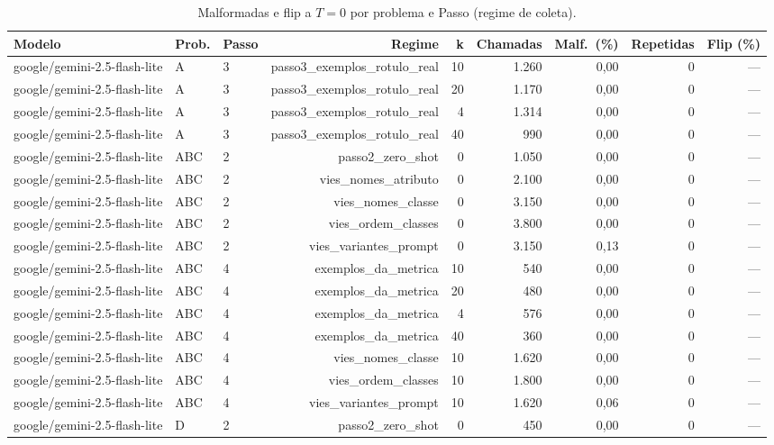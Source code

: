 \begin{table}[htbp]
\centering
\small
\caption{Malformadas e flip a $T=0$ por problema e Passo (regime de coleta).}
\label{tab:final_auditoria_flip_por_passo}
\begin{tabular}{lllrrrrrr}
\toprule
Modelo & Prob. & Passo & Regime & k & Chamadas & Malf.\ (\%) & Repetidas & Flip (\%) \\
\midrule
google/gemini-2.5-flash-lite & A & 3 & passo3\_exemplos\_rotulo\_real & 10 & 1.260 & 0,00 & 0 & — \\
google/gemini-2.5-flash-lite & A & 3 & passo3\_exemplos\_rotulo\_real & 20 & 1.170 & 0,00 & 0 & — \\
google/gemini-2.5-flash-lite & A & 3 & passo3\_exemplos\_rotulo\_real & 4 & 1.314 & 0,00 & 0 & — \\
google/gemini-2.5-flash-lite & A & 3 & passo3\_exemplos\_rotulo\_real & 40 & 990 & 0,00 & 0 & — \\
google/gemini-2.5-flash-lite & ABC & 2 & passo2\_zero\_shot & 0 & 1.050 & 0,00 & 0 & — \\
google/gemini-2.5-flash-lite & ABC & 2 & vies\_nomes\_atributo & 0 & 2.100 & 0,00 & 0 & — \\
google/gemini-2.5-flash-lite & ABC & 2 & vies\_nomes\_classe & 0 & 3.150 & 0,00 & 0 & — \\
google/gemini-2.5-flash-lite & ABC & 2 & vies\_ordem\_classes & 0 & 3.800 & 0,00 & 0 & — \\
google/gemini-2.5-flash-lite & ABC & 2 & vies\_variantes\_prompt & 0 & 3.150 & 0,13 & 0 & — \\
google/gemini-2.5-flash-lite & ABC & 4 & exemplos\_da\_metrica & 10 & 540 & 0,00 & 0 & — \\
google/gemini-2.5-flash-lite & ABC & 4 & exemplos\_da\_metrica & 20 & 480 & 0,00 & 0 & — \\
google/gemini-2.5-flash-lite & ABC & 4 & exemplos\_da\_metrica & 4 & 576 & 0,00 & 0 & — \\
google/gemini-2.5-flash-lite & ABC & 4 & exemplos\_da\_metrica & 40 & 360 & 0,00 & 0 & — \\
google/gemini-2.5-flash-lite & ABC & 4 & vies\_nomes\_classe & 10 & 1.620 & 0,00 & 0 & — \\
google/gemini-2.5-flash-lite & ABC & 4 & vies\_ordem\_classes & 10 & 1.800 & 0,00 & 0 & — \\
google/gemini-2.5-flash-lite & ABC & 4 & vies\_variantes\_prompt & 10 & 1.620 & 0,06 & 0 & — \\
google/gemini-2.5-flash-lite & D & 2 & passo2\_zero\_shot & 0 & 450 & 0,00 & 0 & — \\

\end{tabular}
\end{table}
